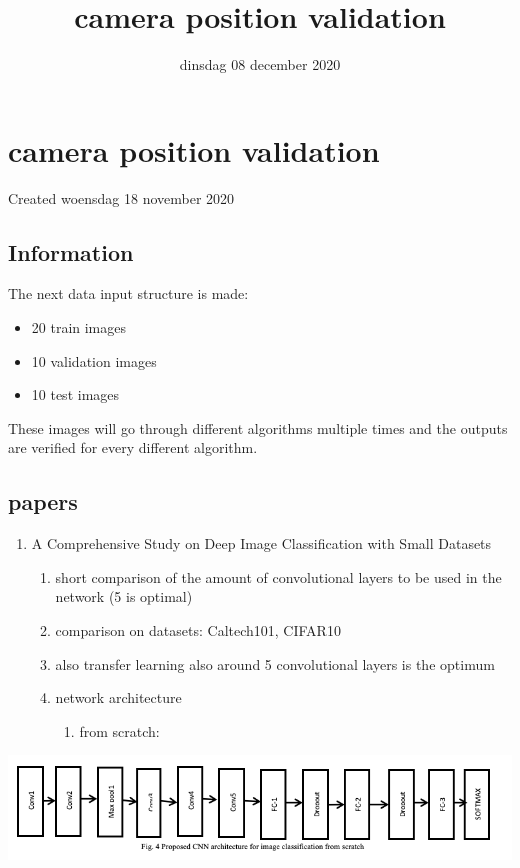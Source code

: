 \documentclass{scrartcl}
\title{camera position validation}
\date{dinsdag 08 december 2020}
\author{}
\begin{document}
\maketitle

		\section{camera position validation}

Created woensdag 18 november 2020



\subsection{Information}

The next data input structure is made:

	\begin{itemize}
	\item 20 train images
	\item 10 validation images
	\item 10 test images
	\end{itemize}


These images will go through different algorithms multiple times and the outputs are verified for every different algorithm.



\subsection{papers}



\begin{enumerate}[1]
\item A Comprehensive Study on Deep Image Classification with Small Datasets
	\begin{enumerate}[a]
	\item short comparison of the amount of convolutional layers to be used in the network (5 is optimal)
	\item comparison on datasets: Caltech101, CIFAR10
	\item also transfer learning also around 5 convolutional layers is the optimum
	\item network architecture
		\begin{enumerate}[1]
		\item from scratch:
		\end{enumerate}
	\end{enumerate}
\end{enumerate}
			\includegraphics[]{./camera_position_validation/paper1_arch_fromscratch.png}
			
\end{document}
